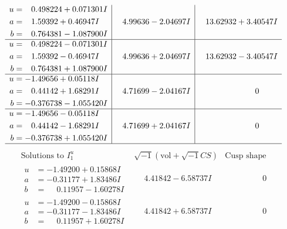 \documentclass[1p]{elsarticle_modified}
\theoremstyle{definition}
\newcommand{\I}{\sqrt{-1}}
\begin{document}
$$\begin{array}{c|c|c}
\begin{aligned}
u &= \phantom{-}0.498224 + 0.071301 I \\
a &= \phantom{-}1.59392 + 0.46947 I \\
b &= \phantom{-}0.764381 - 1.087900 I\end{aligned}
 & \phantom{-}4.99636 - 2.04697 I & \phantom{-}13.62932 + 3.40547 I \\ \hline\begin{aligned}
u &= \phantom{-}0.498224 - 0.071301 I \\
a &= \phantom{-}1.59392 - 0.46947 I \\
b &= \phantom{-}0.764381 + 1.087900 I\end{aligned}
 & \phantom{-}4.99636 + 2.04697 I & \phantom{-}13.62932 - 3.40547 I \\ \hline\begin{aligned}
u &= -1.49656 + 0.05118 I \\
a &= \phantom{-}0.44142 + 1.68291 I \\
b &= -0.376738 - 1.055420 I\end{aligned}
 & \phantom{-}4.71699 - 2.04167 I & \phantom{-0.000000 } 0 \\ \hline\begin{aligned}
u &= -1.49656 - 0.05118 I \\
a &= \phantom{-}0.44142 - 1.68291 I \\
b &= -0.376738 + 1.055420 I\end{aligned}
 & \phantom{-}4.71699 + 2.04167 I & \phantom{-0.000000 } 0\\
 \hline 
 \end{array}$$\newpage$$\begin{array}{c|c|c}  
\text{Solutions to }I^u_{1}& \I (\text{vol} + \sqrt{-1}CS) & \text{Cusp shape}\\
 \hline 
\begin{aligned}
u &= -1.49200 + 0.15868 I \\
a &= -0.31177 + 1.83486 I \\
b &= \phantom{-}0.11957 - 1.60278 I\end{aligned}
 & \phantom{-}4.41842 - 6.58737 I & \phantom{-0.000000 } 0 \\ \hline\begin{aligned}
u &= -1.49200 - 0.15868 I \\
a &= -0.31177 - 1.83486 I \\
b &= \phantom{-}0.11957 + 1.60278 I\end{aligned}
 & \phantom{-}4.41842 + 6.58737 I & \phantom{-0.000000 } 0 \\ \hline\begin{aligned}

\end{aligned}
\end{array}$$
\end{document}
